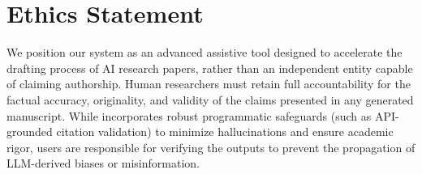 \section*{Ethics Statement}
\label{sec:ethics}

We position our system as an advanced assistive tool designed to accelerate the drafting process of AI research papers, rather than an independent entity capable of claiming authorship. Human researchers must retain full accountability for the factual accuracy, originality, and validity of the claims presented in any generated manuscript. While \ourmethod{} incorporates robust programmatic safeguards (such as API-grounded citation validation) to minimize hallucinations and ensure academic rigor, users are responsible for verifying the outputs to prevent the propagation of LLM-derived biases or misinformation.
